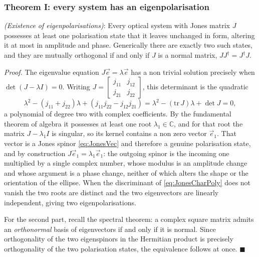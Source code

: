         \subsubsection{Theorem I: every system has an eigenpolarisation}

            \begin{myteo}
                \textit{(Existence of eigenpolarisations)}: Every optical system with Jones matrix $J$ possesses at least one polarisation state that it leaves unchanged in form, altering it at most in amplitude and phase. Generically there are exactly two such states, and they are mutually orthogonal if and only if $J$ is a normal matrix, $JJ^{\dagger}=J^{\dagger}J$.
            \end{myteo}

            \textit{Proof.} The eigenvalue equation $J\vec{e}=\lambda\vec{e}$ has a non trivial solution precisely when $\det\left(J-\lambda I\right)=0$. Writing $J=\left[\begin{smallmatrix}j_{11}&j_{12}\\j_{21}&j_{22}\end{smallmatrix}\right]$, this determinant is the quadratic
            \begin{equation}\label{eq:JonesCharPoly}
                \lambda^2-\left(j_{11}+j_{22}\right)\lambda+\left(j_{11}j_{22}-j_{12}j_{21}\right) = \lambda^2-\left(\text{tr}\,J\right)\lambda+\det J = 0 ,
            \end{equation}
            a polynomial of degree two with complex coefficients. By the fundamental theorem of algebra it possesses at least one root $\lambda_1\in\mathbb{C}$, and for that root the matrix $J-\lambda_1I$ is singular, so its kernel contains a non zero vector $\vec{e}_1$. That vector is a Jones spinor \ref{eq:JonesVec} and therefore a genuine polarisation state, and by construction $J\vec{e}_1=\lambda_1\vec{e}_1$: the outgoing spinor is the incoming one multiplied by a single complex number, whose modulus is an amplitude change and whose argument is a phase change, neither of which alters the shape or the orientation of the ellipse. When the discriminant of \ref{eq:JonesCharPoly} does not vanish the two roots are distinct and the two eigenvectors are linearly independent, giving two eigenpolarisations.

            For the second part, recall the spectral theorem: a complex square matrix admits an \textit{orthonormal} basis of eigenvectors if and only if it is normal. Since orthogonality of the two eigenspinors in the Hermitian product is precisely orthogonality of the two polarisation states, the equivalence follows at once. $\blacksquare$

